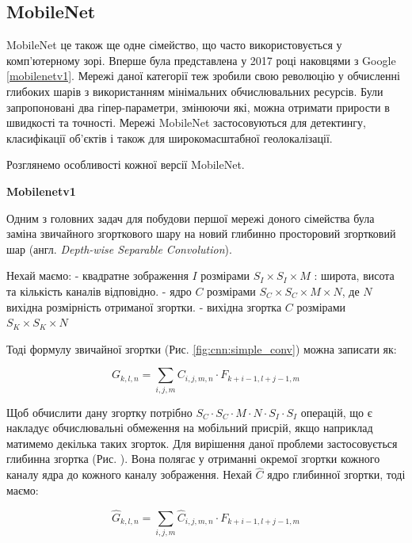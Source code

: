 \subsection{MobileNet}

MobileNet це також ще одне сімейство, що часто використовується у комп'ютерному зорі.
Вперше була представлена у 2017 році наковцями з Google \ref{mobilenetv1}.
Мережі даної категорії теж зробили свою революцію у обчисленні глибоких шарів з 
використанням мінімальних обчислювальних ресурсів. Були запропоновані два гіпер-параметри,
змінюючи які, можна отримати прирости в швидкості та точності. Мережі MobileNet 
застосовуються для детектингу, класифікації об'єктів і також для широкомасштабної
геолокалізації.

Розглянемо особливості кожної версії MobileNet.

\textbf{Mobilenetv1}

Одним з головних задач для побудови першої мережі доного сімейства була заміна
звичайного згорткового шару на новий глибинно просторовий згортковий шар 
(англ. \textit{Depth-wise Separable Convolution}).

Нехай маємо:
 - квадратне зображення $I$ розмірами $S_I \times S_I \times M$ : широта, висота та 
кількість каналів відповідно. 
 - ядро $C$ розмірами $S_C \times S_C \times M \times N$, де $N$ вихідна розмірність 
 отриманої згортки.
 - вихідна згортка $C$ розмірами $S_K \times S_K \times N$

 Тоді формулу звичайної згортки (Рис. \ref{fig:cnn:simple_conv}) можна записати як:

\begin{equation}
    G_{k,l,n} = \sum_{i,j,m} C_{i,j,m,n} · F_{k+i-1, l+j-1,m}
    \label{eq:simple_conv}
\end{equation}

Щоб обчислити дану згортку потрібно $S_C · S_C · M · N · S_I · S_I$ операцій, що
є накладує обчислювальні обмеження на мобільний присрій, якщо наприклад матимемо
декілька таких згорток.
Для вирішення даної проблеми застосовується глибинна згортка (Рис. ). Вона полягає
у отриманні окремої згортки кожного каналу ядра до кожного каналу 
зображення.
Нехай $\widehat{C}$ ядро глибинної згортки, тоді маємо:

\begin{equation}
    \widehat{G}_{k,l,n} = \sum_{i,j,m} \widehat{C}_{i,j,m,n} · F_{k+i-1, l+j-1,m}
    \label{eq:deep_wise_conv}
\end{equation}

